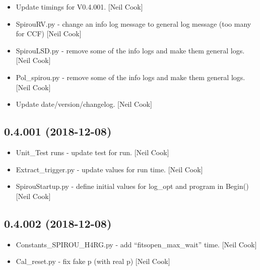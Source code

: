 \documentclass[a4paper,10pt,english]{report}
\begin{document}
\begin{itemize}
\item {} 
Update timings for V0.4.001. {[}Neil Cook{]}

\item {} 
SpirouRV.py - change an info log message to general log message (too
many for CCF) {[}Neil Cook{]}

\item {} 
SpirouLSD.py - remove some of the info logs and make them general
logs. {[}Neil Cook{]}

\item {} 
Pol\_spirou.py - remove some of the info logs and make them general
logs. {[}Neil Cook{]}

\item {} 
Update date/version/changelog. {[}Neil Cook{]}

\end{itemize}


\subsection{0.4.001 (2018-12-08)}
\label{\detokenize{misc/changelog:id242}}\begin{itemize}
\item {} 
Unit\_Test runs - update test for run. {[}Neil Cook{]}

\item {} 
Extract\_trigger.py - update values for run time. {[}Neil Cook{]}

\item {} 
SpirouStartup.py - define initial values for log\_opt and program in
Begin() {[}Neil Cook{]}

\end{itemize}


\subsection{0.4.002 (2018-12-08)}
\label{\detokenize{misc/changelog:id243}}\begin{itemize}
\item {} 
Constants\_SPIROU\_H4RG.py - add “fitsopen\_max\_wait” time. {[}Neil Cook{]}

\item {} 
Cal\_reset.py - fix fake p (with real p) {[}Neil Cook{]}

\end{itemize}
\end{document}
